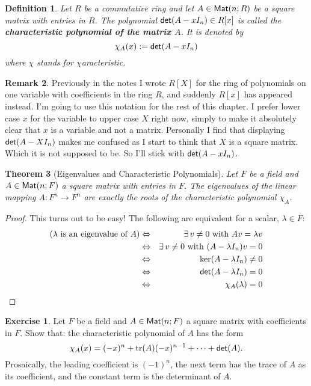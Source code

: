 \documentclass[11pt]{amsbook}
\newtheorem{theorem}{Theorem}[section]
\newtheorem{definition}[theorem]{Definition}
\theoremstyle{definition}
\newtheorem{rem}[theorem]{Remark}
\newtheorem{exercise}{Exercise}
\begin{document}
\begin{definition}
Let $R$ be a commutative ring and let $A\in {\sf Mat}(n;R)$ be a square matrix with entries in $R$.
The polynomial ${\sf det}(A-x I_n) \in R[x]$ is called the {\bf characteristic polynomial of the matrix $A$}. It is denoted by $$\chi_A(x) := {\sf det}(A- x I_n)$$ where $\chi$ stands for $\chi$aracteristic.
\end{definition}

\begin{rem}
Previously in the notes I wrote $R[X]$ for the ring of polynomials on one variable with coefficients in the ring $R$, and suddenly $R[x]$ has appeared instead. I'm going to use this notation for the rest of this chapter. I prefer lower case $x$ for the variable to upper case $X$ right now, simply to make it absolutely clear that $x$ is a variable and not a matrix. Personally I find that displaying ${\sf det}(A-XI_n)$ makes me confused as I start to think that $X$ is a square matrix. Which it is not supposed to be. So I'll stick with ${\sf det}(A-xI_n)$.
\end{rem}


\begin{theorem} [Eigenvalues and Characteristic Polynomials] \label{evalchar}
Let $F$ be a field and $A\in {\sf Mat}(n;F)$ a square matrix with entries in $F$. The eigenvalues of the linear mapping $A: {F}^n \to {F}^n$ are exactly the roots of the characteristic polynomial $\chi_A$.
\end{theorem}
\begin{proof}This turns out to be easy! The following are equivalent for a scalar, $\lambda \in F$:
\begin{eqnarray*}
(\lambda \text{ is an eigenvalue of }A) & \Leftrightarrow & \exists \, v\neq 0 \text{ with } Av = \lambda v \\
 & \Leftrightarrow & \exists \, v\neq 0 \text{ with } (A- \lambda I_n)v = 0 \\
  & \Leftrightarrow & {\rm ker} ( A - \lambda I_n) \neq 0 \\
   & \Leftrightarrow & {\sf det}(A - \lambda I_n) = 0 \\
    & \Leftrightarrow & \chi_A(\lambda) = 0
    \end{eqnarray*}
    \end{proof}

\begin{exercise}
Let $F$ be a field and $A\in {\sf Mat}(n;F)$ a square matrix with coefficients in $F$. Show that: the characteristic polynomial of $A$ has the form $$\chi_A(x) = (-x)^n + {\rm tr}(A) (-x)^{n-1} + \cdots + {\sf det}(A).$$ Prosaically, the leading coefficient is $(-1)^n$, the next term has the trace of $A$ as its coefficient, and the constant term is the determinant of $A$.
\end{exercise}
\end{document}
